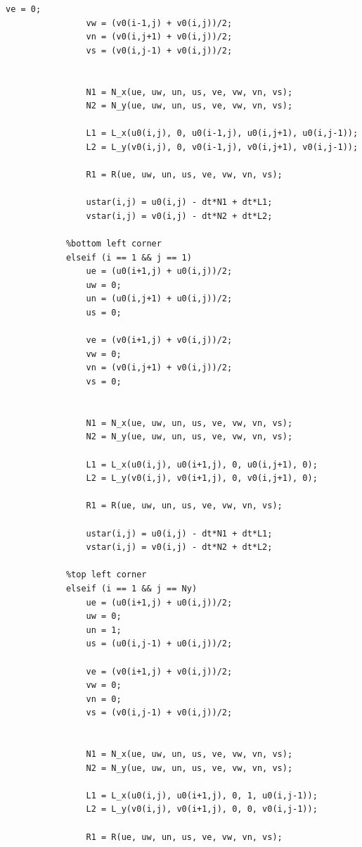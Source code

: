 \documentclass{article}
\begin{document}
\begin{itemize}
\begin{center}
\begin{lstlisting}[style = Matlab-editor]
                ve = 0;
                vw = (v0(i-1,j) + v0(i,j))/2;
                vn = (v0(i,j+1) + v0(i,j))/2;
                vs = (v0(i,j-1) + v0(i,j))/2;

                
                N1 = N_x(ue, uw, un, us, ve, vw, vn, vs);
                N2 = N_y(ue, uw, un, us, ve, vw, vn, vs);

                L1 = L_x(u0(i,j), 0, u0(i-1,j), u0(i,j+1), u0(i,j-1));
                L2 = L_y(v0(i,j), 0, v0(i-1,j), v0(i,j+1), v0(i,j-1));

                R1 = R(ue, uw, un, us, ve, vw, vn, vs);

                ustar(i,j) = u0(i,j) - dt*N1 + dt*L1;
                vstar(i,j) = v0(i,j) - dt*N2 + dt*L2;

            %bottom left corner
            elseif (i == 1 && j == 1)
                ue = (u0(i+1,j) + u0(i,j))/2;
                uw = 0;
                un = (u0(i,j+1) + u0(i,j))/2;
                us = 0;

                ve = (v0(i+1,j) + v0(i,j))/2;
                vw = 0;
                vn = (v0(i,j+1) + v0(i,j))/2;
                vs = 0;

                
                N1 = N_x(ue, uw, un, us, ve, vw, vn, vs);
                N2 = N_y(ue, uw, un, us, ve, vw, vn, vs);

                L1 = L_x(u0(i,j), u0(i+1,j), 0, u0(i,j+1), 0);
                L2 = L_y(v0(i,j), v0(i+1,j), 0, v0(i,j+1), 0);

                R1 = R(ue, uw, un, us, ve, vw, vn, vs);

                ustar(i,j) = u0(i,j) - dt*N1 + dt*L1;
                vstar(i,j) = v0(i,j) - dt*N2 + dt*L2;

            %top left corner
            elseif (i == 1 && j == Ny)
                ue = (u0(i+1,j) + u0(i,j))/2;
                uw = 0;
                un = 1;
                us = (u0(i,j-1) + u0(i,j))/2;

                ve = (v0(i+1,j) + v0(i,j))/2;
                vw = 0;
                vn = 0;
                vs = (v0(i,j-1) + v0(i,j))/2;

                
                N1 = N_x(ue, uw, un, us, ve, vw, vn, vs);
                N2 = N_y(ue, uw, un, us, ve, vw, vn, vs);

                L1 = L_x(u0(i,j), u0(i+1,j), 0, 1, u0(i,j-1));
                L2 = L_y(v0(i,j), v0(i+1,j), 0, 0, v0(i,j-1));

                R1 = R(ue, uw, un, us, ve, vw, vn, vs);


\end{lstlisting}
\end{center}
\end{itemize}
\end{document}
